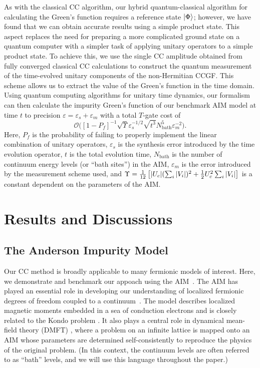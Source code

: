 \documentclass[aip,reprint,table,xcdraw,usenames,dvipsnames]{revtex4-1}
\begin{document}
As with the classical CC algorithm, our hybrid quantum-classical algorithm 
for calculating the Green’s function requires a reference state $\ket{\Phi}$; however, we have found that we can obtain accurate results using 
a simple product state. This aspect replaces the need for preparing a more complicated ground state on a quantum computer with a simpler task of applying unitary operators to a simple product state. To achieve this, we use the single CC amplitude obtained from fully converged classical CC calculations to construct the quantum measurement of the time-evolved unitary components of the non-Hermitian CCGF. This scheme allows us to extract the value of the Green’s function in the time domain. Using quantum computing algorithms for unitary time dynamics, our formalism can then calculate the impurity Green's function of our benchmark AIM model at time $t$ to precision $\varepsilon = \varepsilon_s + \varepsilon_m$
with a total $T$-gate cost of 
\begin{equation*}
\mathcal{O} \big([1-P_f]^{-1} \sqrt{\Upsilon} \varepsilon_s^{-1/2} \sqrt{t^3} N_\mathrm{bath}^5 \varepsilon_m^{-2}\big). 
\end{equation*}
Here, $P_f$ is the probability of failing to properly implement the linear combination of unitary operators, $\varepsilon_s$ is the synthesis error introduced by the time evolution operator, $t$ is the total evolution time, $N_{\text{bath}}$ is the number of continuum energy levels (or ``bath sites'') in the AIM, $\varepsilon_m$ is the error introduced by the measurement scheme used, and $\Upsilon = \frac{1}{12} \left[ \abs{ U_c} (\sum_i \abs{V_i})^2 + \frac{1}{2} U_c^2 \sum_i \abs{V_i} \right]$ is a constant dependent on the parameters of the AIM.

\section{Results and Discussions} \label{sec:results}

\subsection*{The Anderson Impurity Model} \label{sec:AIM}
Our CC method is broadly applicable to many fermionic models of interest. Here, we demonstrate and benchmark our appoach using the AIM~\cite{Anderson1961}. The AIM has played an essential role in developing our understanding of localized fermionic degrees of freedom coupled to a continuum~\cite{Mahan1990}. The model describes localized magnetic moments embedded in a sea of conduction electrons and is closely related to the Kondo problem \cite{Schrieffer1966, AIMReview}. It also plays a central role in dynamical mean-field theory (DMFT) \cite{Georges1996}, where a problem on an infinite lattice  is mapped onto an AIM whose parameters are determined self-consistently to reproduce the physics of the original problem. (In this context, the continuum levels are often referred to as ``bath'' levels, and we will use this language throughout the paper.)
\end{document}
